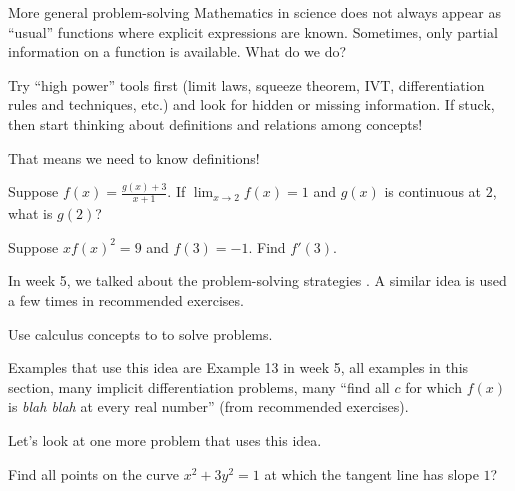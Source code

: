 \documentclass[../main.tex]{subfiles}
\begin{document}
\begin{lesson}{More general problem-solving}
  Mathematics in science does not always appear as ``usual'' functions where explicit expressions are known. Sometimes, only partial information on a function is available. What do we do?

  \begin{mdframed}[style=simple-compact]
    Try ``high power'' tools first (limit laws, squeeze theorem, IVT, differentiation rules and techniques, etc.) and look for hidden or missing information. If stuck, then start thinking about definitions and relations among concepts!

    That means we need to know definitions!
  \end{mdframed}

  \begin{example}
    Suppose \(f(x) = \frac{g(x) + 3}{x+1}\).  If \(\lim_{x \to 2} f(x) = 1\) and \(g(x)\) is continuous at \(2\), what is \(g(2)\)?
  \end{example}

  \begin{example}
    Suppose \(xf(x)^{2} = 9\) and \(f(3) = -1\). Find \(f'(3)\).

  \end{example}
  \clearpage

  In week 5, we talked about the problem-solving strategies . A similar idea is used a few times in recommended exercises.
  \begin{mdframed}[style=simple-compact]
    Use calculus concepts to  to solve problems.
  \end{mdframed}

  Examples that use this idea are Example 13 in week 5, all examples in this section, many implicit differentiation problems, many ``find all \(c\) for which \(f(x)\) is \emph{blah blah} at every real number'' (from recommended exercises).

  Let's look at one more problem that uses this idea. 

  \begin{example}
    Find all points on the curve \(x^{2} + 3y^{2} = 1\) at which the tangent line has slope \(1\)?
    
  \end{example}
\end{lesson}
\end{document}
